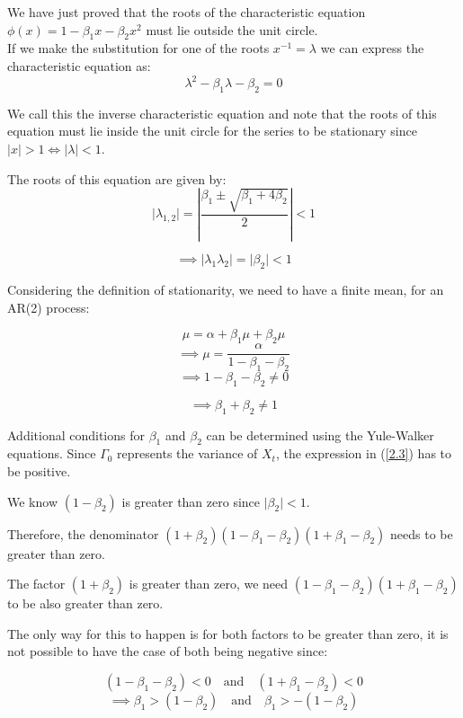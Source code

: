 \documentclass[11pt]{article}
\begin{document}
We have just proved that the roots of the characteristic equation $\phi(x)=1-\beta_1x-\beta_2x^2$ must lie outside the unit circle.\\ 
If we make the substitution for one of the roots $x^{-1} = \lambda$ we can express the characteristic equation as:
\begin{equation}\label{2.4}
\lambda^2 - \beta_1\lambda  - \beta_2 = 0
\end{equation}   

We call this the inverse characteristic equation and note that the roots of this equation must lie inside the unit circle for the series to be stationary since $\lvert x \rvert > 1 \iff \lvert \lambda \rvert < 1$.

The roots of this equation are given by: 
$$\lvert \lambda_{1,2} \rvert = \left|{\frac{\beta_1 \pm \sqrt{\beta_1 + 4\beta_2}}{2}}\right| < 1$$

\begin{equation}\label{2.5}
\implies \lvert \lambda_1\lambda_2 \rvert = \lvert \beta_2 \rvert < 1  
\end{equation}

Considering the definition of stationarity, we need to have a finite mean, for an AR(2) process:

$$\mu =  \alpha + \beta_1\mu + \beta_2\mu$$
$$\implies  \mu = \frac{\alpha}{1-\beta_1-\beta_2}$$
$$\implies  1-\beta_1-\beta_2 \ne 0$$

\begin{equation}\label{2.6}
\implies  \beta_1+\beta_2 \ne 1
\end{equation}

Additional conditions for $\beta_1$ and $\beta_2$ can be determined using the Yule-Walker equations.
Since $\Gamma_0$ represents the variance of $X_t$, the expression in (\ref{2.3}) has to be positive.

We know $(1-\beta_2)$ is greater than zero since $\lvert \beta_2 \rvert < 1$. 

Therefore, the denominator $(1+\beta_2)(1-\beta_1-\beta_2)(1+\beta_1-\beta_2)$ needs to be greater than zero.

The factor $(1+\beta_2)$ is greater than zero, we need $(1-\beta_1-\beta_2)(1+\beta_1-\beta_2)$ to be also greater than zero.

The only way for this to happen is for both factors to be greater than zero, it is not possible to have the case of both being negative since:

$$(1-\beta_1-\beta_2) < 0 \quad\text{and}\quad (1+\beta_1-\beta_2) < 0$$
$$\implies \beta_1>(1-\beta_2) \quad\text{and}\quad \beta_1>-(1-\beta_2)$$
\end{document}
